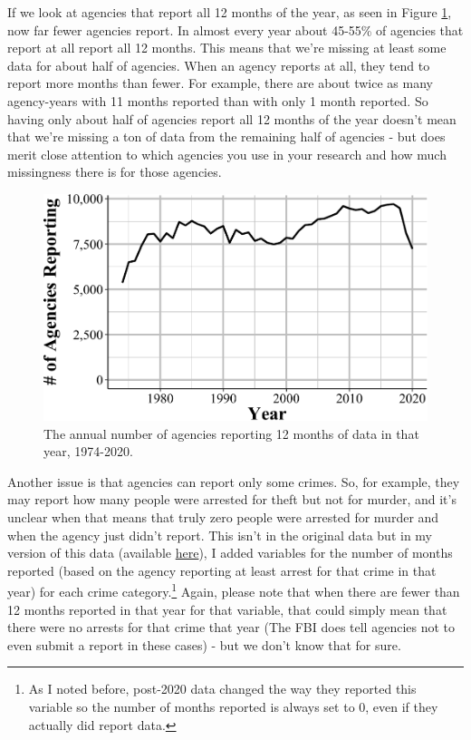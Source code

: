 \documentclass[
  12pt,
  openany]{book}
\begin{document}
If we look at agencies that report all 12 months of the year, as seen in Figure \ref{fig:arrestsAgenciesReporting12Months}, now far fewer agencies report. In almost every year about 45-55\% of agencies that report at all report all 12 months. This means that we're missing at least some data for about half of agencies. When an agency reports at all, they tend to report more months than fewer. For example, there are about twice as many agency-years with 11 months reported than with only 1 month reported. So having only about half of agencies report all 12 months of the year doesn't mean that we're missing a ton of data from the remaining half of agencies - but does merit close attention to which agencies you use in your research and how much missingness there is for those agencies.

\begin{figure}

{\centering \includegraphics[width=0.9\linewidth]{05_arrests_files/figure-latex/arrestsAgenciesReporting12Months-1} 

}

\caption{The annual number of agencies reporting 12 months of data in that year, 1974-2020.}\label{fig:arrestsAgenciesReporting12Months}
\end{figure}

Another issue is that agencies can report only some crimes. So, for example, they may report how many people were arrested for theft but not for murder, and it's unclear when that means that truly zero people were arrested for murder and when the agency just didn't report. This isn't in the original data but in my version of this data (available \href{https://www.openicpsr.org/openicpsr/project/102263/version/V15/view}{here}), I added variables for the number of months reported (based on the agency reporting at least arrest for that crime in that year) for each crime category.\footnote{As I noted before, post-2020 data changed the way they reported this variable so the number of months reported is always set to 0, even if they actually did report data.} Again, please note that when there are fewer than 12 months reported in that year for that variable, that could simply mean that there were no arrests for that crime that year (The FBI does tell agencies not to even submit a report in these cases) - but we don't know that for sure.
\end{document}
